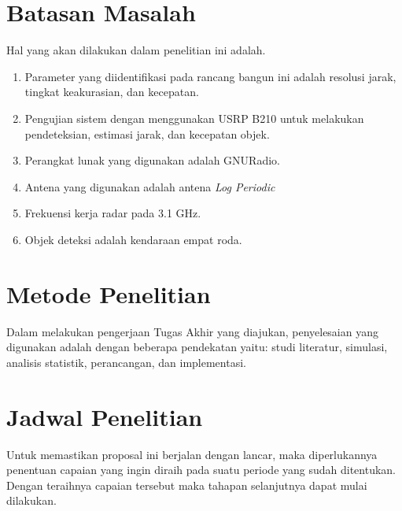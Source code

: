 \section{Batasan Masalah}
Hal yang akan dilakukan dalam penelitian ini adalah.
\begin{enumerate}
	\item Parameter yang diidentifikasi pada rancang bangun ini adalah resolusi jarak, tingkat keakurasian, dan kecepatan.
	\item Pengujian sistem dengan menggunakan USRP B210 untuk melakukan pendeteksian, estimasi jarak, dan kecepatan objek.
	\item Perangkat lunak yang digunakan adalah GNURadio.
	\item Antena yang digunakan adalah antena \textit{Log Periodic}
	\item Frekuensi kerja radar pada 3.1 GHz.
	\item Objek deteksi adalah kendaraan empat roda.
\end{enumerate}

\section{Metode Penelitian}
Dalam melakukan pengerjaan Tugas Akhir yang diajukan, penyelesaian yang digunakan adalah dengan beberapa pendekatan yaitu: studi literatur, simulasi, analisis statistik, perancangan, dan implementasi.

\section{Jadwal Penelitian}
Untuk memastikan proposal ini berjalan dengan lancar, maka diperlukannya penentuan capaian yang ingin diraih pada suatu periode yang sudah ditentukan. Dengan teraihnya capaian tersebut maka tahapan selanjutnya dapat mulai dilakukan.

